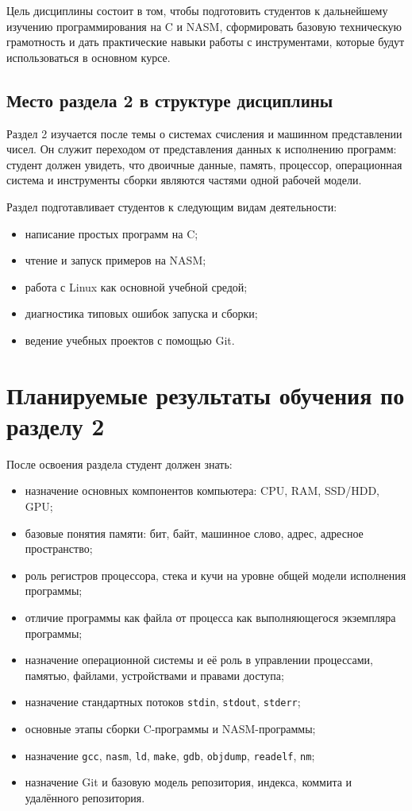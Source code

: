 \documentclass[a4paper,14pt]{extreport}
\begin{document}
Цель дисциплины состоит в том, чтобы подготовить студентов к дальнейшему изучению программирования на C и NASM, сформировать базовую техническую грамотность и дать практические навыки работы с инструментами, которые будут использоваться в основном курсе.

\section{Место раздела 2 в структуре дисциплины}

Раздел 2 изучается после темы о системах счисления и машинном представлении чисел. Он служит переходом от представления данных к исполнению программ: студент должен увидеть, что двоичные данные, память, процессор, операционная система и инструменты сборки являются частями одной рабочей модели.

Раздел подготавливает студентов к следующим видам деятельности:

\begin{itemize}
    \item написание простых программ на C;
    \item чтение и запуск примеров на NASM;
    \item работа с Linux как основной учебной средой;
    \item диагностика типовых ошибок запуска и сборки;
    \item ведение учебных проектов с помощью Git.
\end{itemize}

\chapter{Планируемые результаты обучения по разделу 2}

После освоения раздела студент должен знать:

\begin{itemize}
    \item назначение основных компонентов компьютера: CPU, RAM, SSD/HDD, GPU;
    \item базовые понятия памяти: бит, байт, машинное слово, адрес, адресное пространство;
    \item роль регистров процессора, стека и кучи на уровне общей модели исполнения программы;
    \item отличие программы как файла от процесса как выполняющегося экземпляра программы;
    \item назначение операционной системы и её роль в управлении процессами, памятью, файлами, устройствами и правами доступа;
    \item назначение стандартных потоков \texttt{stdin}, \texttt{stdout}, \texttt{stderr};
    \item основные этапы сборки C-программы и NASM-программы;
    \item назначение \texttt{gcc}, \texttt{nasm}, \texttt{ld}, \texttt{make}, \texttt{gdb}, \texttt{objdump}, \texttt{readelf}, \texttt{nm};
    \item назначение Git и базовую модель репозитория, индекса, коммита и удалённого репозитория.
\end{itemize}
\end{document}
